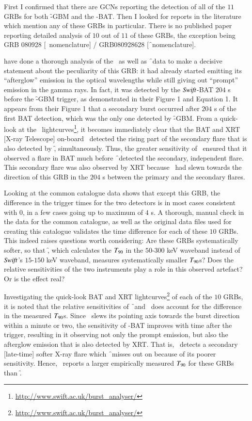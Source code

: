 First I confirmed that there are GCNs reporting the detection of all of the $11$ GRBs for both \f -GBM and the \s -BAT. Then I looked for reports in the literature which mention any of these GRBs in particular. There is no published paper reporting detailed analysis of $10$ out of $11$ of these GRBs, the exception being GRB 080928 [\s\ nomenclature] / GRB080928628 [\f\ nomenclature].

\cite{Rossi_et_al.-2011-A&A} have done a thorough analysis of the \s\ as well as \f\ data to make a decisive statement about the peculiarity of this GRB: it had already started emitting its ``afterglow'' emission in the optical wavelengths while still giving out ``prompt'' emission in the gamma rays. In fact, it was detected by the $\emph{Swift}$-BAT $204$ s before the \f -GBM trigger, as demonstrated in their Figure 1 and Equation 1. It appears from their Figure 1 that a secondary burst occurred after $204$ s of the first BAT detection, which was the only one detected by \f -GBM. From a quick-look at the \s\ lightcurves\footnote{\url{http://www.swift.ac.uk/burst_analyser/}}, it becomes immediately clear that the BAT and XRT [X-ray Telescope] on-board \s\ detected the rising part of the secondary flare that is also detected by \f, simultaneously. Thus, the greater sensitivity of \s\ ensured that it observed a flare in BAT much before \f\ detected the secondary, independent flare. This secondary flare was also observed by XRT because \s\ had slewn towards the direction of this GRB in the $204$ s between the primary and the secondary flares.

Looking at the common catalogue data shows that except this GRB, the difference in the trigger times for the two detectors is in most cases consistent with $0$, in a few cases going up to maximum of $4$ s. A thorough, manual check in the data for the common catalogue, as well as the original data files used for creating this catalogue validates the time difference for each of these $10$ GRBs. This indeed raises questions worth considering: Are these GRBs systematically softer, so that \f, which calculates the $T_{\rm{90}}$ in the $50$-$300$ keV waveband instead of $\emph{Swift}$'s $15$-$150$ keV waveband, measures systematically smaller $T_{\rm{90}}$s? Does the relative sensitivities of the two instruments play a role in this observed artefact? Or is the effect real?

Investigating the quick-look BAT and XRT lightcurves\footnote{\url{http://www.swift.ac.uk/burst_analyser/}} of each of the $10$ GRBs, it is noted that the relative sensitivities of \f\ and \s\ does account for the difference in the measured $T_{\rm{90}}$s. Since \s\ slews its pointing axis towards the burst direction within a minute or two, the sensitivity of \s -BAT improves with time after the trigger, resulting in it observing not only the prompt emission, but also the afterglow emission that is also detected by XRT. That is, \s\ detects a secondary [late-time] softer X-ray flare which \f\ misses out on because of its poorer sensitivity. Hence, \s\ reports a larger empirically measured $T_{\rm{90}}$ for these GRBs than \f.

